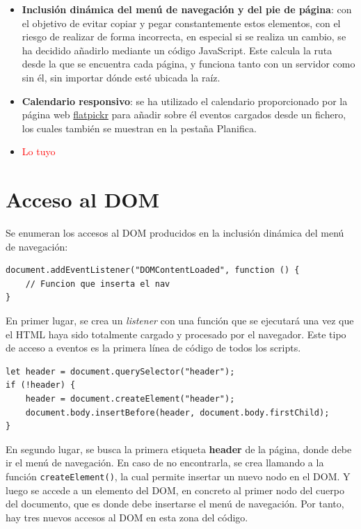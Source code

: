 \documentclass[11pt, a4paper]{book}
\begin{document}
	\begin{itemize}
		\item \textbf{Inclusión dinámica del menú de navegación y del pie de página}: con el objetivo de evitar copiar y pegar constantemente estos elementos, con el riesgo de realizar de forma incorrecta, en especial si se realiza un cambio, se ha decidido añadirlo mediante un código JavaScript. Este calcula la ruta desde la que se encuentra cada página, y funciona tanto con un servidor como sin él, sin importar dónde esté ubicada la raíz.
		\item \textbf{Calendario responsivo}: se ha utilizado el calendario proporcionado por la página web \href{https://flatpickr.js.org/}{flatpickr} para añadir sobre él eventos cargados desde un fichero, los cuales también se muestran en la pestaña Planifica.
		\item \textcolor{red}{Lo tuyo}
	\end{itemize}

	
	
	\section{Acceso al DOM}
	
	Se enumeran los accesos al DOM producidos en la inclusión dinámica del menú de navegación:
	
	\begin{lstlisting}
document.addEventListener("DOMContentLoaded", function () {
	// Funcion que inserta el nav
}
	\end{lstlisting}

	En primer lugar, se crea un \textit{listener} con una función que se ejecutará una vez que el HTML haya sido totalmente cargado y procesado por el navegador. Este tipo de acceso a eventos es la primera línea de código de todos los scripts.
	
	\begin{lstlisting}
let header = document.querySelector("header");
if (!header) {
	header = document.createElement("header");
	document.body.insertBefore(header, document.body.firstChild);
}
	\end{lstlisting}

	En segundo lugar, se busca la primera etiqueta \textbf{header} de la página, donde debe ir el menú de navegación. En caso de no encontrarla, se crea llamando a la función \texttt{createElement()}, la cual permite insertar un nuevo nodo en el DOM. Y luego se accede a un elemento del DOM, en concreto al primer nodo del cuerpo del documento, que es donde debe insertarse el menú de navegación.	Por tanto, hay tres nuevos accesos al DOM en esta zona del código. 
	
\end{document}
